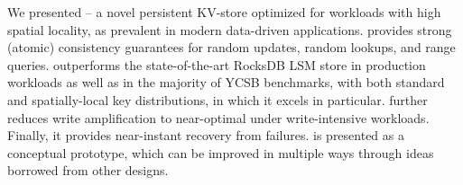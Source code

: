 We presented \sys\/ -- a novel persistent KV-store optimized for workloads with high spatial locality, as prevalent in modern data-driven 
applications. \sys\/ provides strong (atomic) consistency guarantees for random updates, random lookups, and range queries. 
\sys\/ outperforms the state-of-the-art RocksDB LSM store in production workloads as well as in the majority of YCSB benchmarks, with both 
standard and spatially-local key distributions, in which it excels in particular. \sys\/ further reduces write amplification to near-optimal under write-intensive 
workloads. Finally, it provides near-instant recovery from failures.
\sys\/ is presented as a conceptual prototype, which can be improved in multiple ways through ideas borrowed from other designs. 
